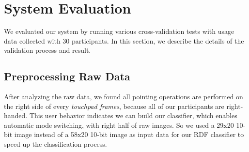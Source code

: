 
\section{System Evaluation}

We evaluated our system by running various cross-validation tests with usage data collected with 30 participants.
In this section, we describe the details of the validation process and result.
\subsection{Preprocessing Raw Data}
After analyzing the raw data, we found all pointing operations are performed on the right side of every \emph{touchpad frames}, because all of our participants are right-handed.
This user behavior indicates we can build our classifier, which enables automatic mode switching, with right half of raw images. 
So we used a 29x20 10-bit image instead of a 58x20 10-bit image as input data for our RDF classifier to speed up the classification process.


